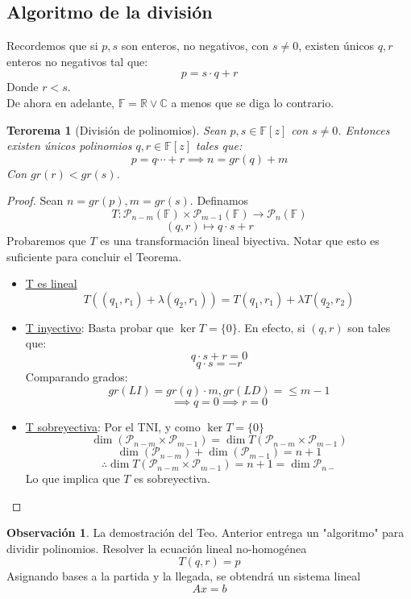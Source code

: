 \documentclass[11pt]{book}
\newtheorem{thm}{Terorema}[section]
\theoremstyle{definition}
\newtheorem{obs}{Observación}[section]
\begin{document}
\subsection{Algoritmo de la división}
Recordemos que si $p,s$ son enteros, no negativos, con $s\neq 0$, existen únicos $q,r$ enteros no negativos tal que:
\[p=s\cdot q+r\]
Donde $r<s$.\\
De ahora en adelante, $\mathbb{F}=\mathbb{R}\vee\mathbb{C}$ a menos que se diga lo contrario.
\begin{thm}[División de polinomios]
Sean $p,s\in\mathbb{F}[z]$ con $s\neq 0$. Entonces existen únicos polinomios $q,r\in\mathbb{F}[z]$ tales que:
\[p=q\cdots+r\implies n=gr(q)+m\]
Con $gr(r)<gr(s)$.
\end{thm}
\begin{proof}
Sean $n=gr(p), m=gr(s)$. Definamos
\[T:\mathcal{P}_{n-m}(\mathbb{F})\times\mathcal{P}_{m-1}(\mathbb{F})\rightarrow\mathcal{P}_{n}(\mathbb{F})\]
\[(q,r)\mapsto q\cdot s+r\]
Probaremos que $T$ es una transformación lineal biyectiva. Notar que esto es suficiente para concluir el Teorema.
\begin{itemize}
	\item \underline{T es lineal}
	\[T((q_1,r_1)+\lambda (q_2,r_1))=T(q_1,r_1)+\lambda T(q_2,r_2)\]
	
	\item \underline{T inyectivo}: Basta probar que $\ker T=\{0\}$. En efecto, si $(q,r)$ son tales que:
	\[q\cdot s+r=0\]
	\[q\cdot s=-r\]
	Comparando grados:
	\[gr(LI)=gr(q)\cdot m,gr(LD)=\leq m-1\]
	\[\implies q=0\implies r=0\]
	
	\item \underline{T sobreyectiva}: Por el TNI, y como $\ker T=\{0\}$
	\[\dim(\mathcal{P}_{n-m}\times\mathcal{P}_{m-1})=\dim T(\mathcal{P}_{n-m}\times\mathcal{P}_{m-1})\]
	\[\dim(\mathcal{P}_{n-m})+\dim(\mathcal{P}_{m-1})=n+1\]
	\[\therefore \dim T(\mathcal{P}_{n-m}\times\mathcal{P}_{m-1})=n+1=\dim\mathcal{P}_{n-}\]
	Lo que implica que $T$ es sobreyectiva.
\end{itemize}
\end{proof}
\begin{obs}
La demostración del Teo. Anterior entrega un "algoritmo" para dividir polinomios. Resolver la ecuación lineal no-homogénea
\[T(q,r)=p\]
Asignando bases a la partida y la llegada, se obtendrá un sistema lineal
\[Ax=b\]
\end{obs}
\end{document}
